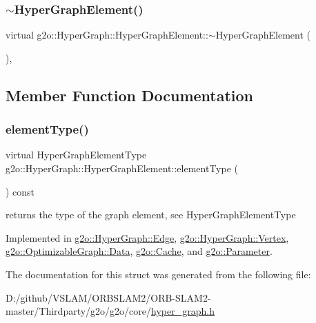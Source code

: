 \subsubsection{\texorpdfstring{$\sim$\+Hyper\+Graph\+Element()}{~HyperGraphElement()}}
{\footnotesize\ttfamily virtual g2o\+::\+Hyper\+Graph\+::\+Hyper\+Graph\+Element\+::$\sim$\+Hyper\+Graph\+Element (\begin{DoxyParamCaption}{ }\end{DoxyParamCaption})\hspace{0.3cm}{\ttfamily [inline]}, {\ttfamily [virtual]}}



\subsection{Member Function Documentation}
\mbox{\label{structg2o_1_1_hyper_graph_1_1_hyper_graph_element_a1a9d7b748698c09d202373e06e413ef2}} 
\subsubsection{\texorpdfstring{element\+Type()}{elementType()}}
{\footnotesize\ttfamily virtual Hyper\+Graph\+Element\+Type g2o\+::\+Hyper\+Graph\+::\+Hyper\+Graph\+Element\+::element\+Type (\begin{DoxyParamCaption}{ }\end{DoxyParamCaption}) const\hspace{0.3cm}{\ttfamily [pure virtual]}}

returns the type of the graph element, see Hyper\+Graph\+Element\+Type 

Implemented in \mbox{\hyperlink{classg2o_1_1_hyper_graph_1_1_edge_a04f1b4d408aebdf14ac3f0cfd247b776}{g2o\+::\+Hyper\+Graph\+::\+Edge}}, \mbox{\hyperlink{classg2o_1_1_hyper_graph_1_1_vertex_a8f214b9065b88a3aafff7442380476ab}{g2o\+::\+Hyper\+Graph\+::\+Vertex}}, \mbox{\hyperlink{classg2o_1_1_optimizable_graph_1_1_data_aa98d48f62d4c620cb62fbaeb1775389b}{g2o\+::\+Optimizable\+Graph\+::\+Data}}, \mbox{\hyperlink{classg2o_1_1_cache_ace402a9e59f3fe28ae7e44854cbc5e97}{g2o\+::\+Cache}}, and \mbox{\hyperlink{classg2o_1_1_parameter_a44ace751794dcde7a5fd52d16e2f4f21}{g2o\+::\+Parameter}}.



The documentation for this struct was generated from the following file\+:\begin{DoxyCompactItemize}
\item 
D\+:/github/\+V\+S\+L\+A\+M/\+O\+R\+B\+S\+L\+A\+M2/\+O\+R\+B-\/\+S\+L\+A\+M2-\/master/\+Thirdparty/g2o/g2o/core/\mbox{\hyperlink{hyper__graph_8h}{hyper\+\_\+graph.\+h}}\end{DoxyCompactItemize}
